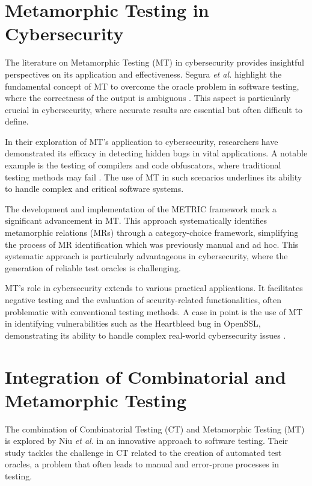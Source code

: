 \section{Metamorphic Testing in Cybersecurity}

The literature on Metamorphic Testing (MT) in cybersecurity provides insightful perspectives on its application and effectiveness. Segura \textit{et al.} highlight the fundamental concept of MT to overcome the oracle problem in software testing, where the correctness of the output is ambiguous \cite{CybersecurityMT}. This aspect is particularly crucial in cybersecurity, where accurate results are essential but often difficult to define.

In their exploration of MT's application to cybersecurity, researchers have demonstrated its efficacy in detecting hidden bugs in vital applications. A notable example is the testing of compilers and code obfuscators, where traditional testing methods may fail \cite{CybersecurityMT} \cite{GLSLFuzz}. The use of MT in such scenarios underlines its ability to handle complex and critical software systems.

The development and implementation of the METRIC framework \cite{ChenPoon2016} mark a significant advancement in MT. This approach systematically identifies metamorphic relations (MRs) through a category-choice framework, simplifying the process of MR identification which was previously manual and ad hoc. This systematic approach is particularly advantageous in cybersecurity, where the generation of reliable test oracles is challenging.

MT's role in cybersecurity extends to various practical applications. It facilitates negative testing and the evaluation of security-related functionalities, often problematic with conventional testing methods. A case in point is the use of MT in identifying vulnerabilities such as the Heartbleed bug in OpenSSL, demonstrating its ability to handle complex real-world cybersecurity issues \cite{OpenSSLMT}.

\section{Integration of Combinatorial and Metamorphic Testing}

The combination of Combinatorial Testing (CT) and Metamorphic Testing (MT) is explored by Niu \textit{et al.} \cite{comer} in an innovative approach to software testing. Their study tackles the challenge in CT related to the creation of automated test oracles, a problem that often leads to manual and error-prone processes in testing.


